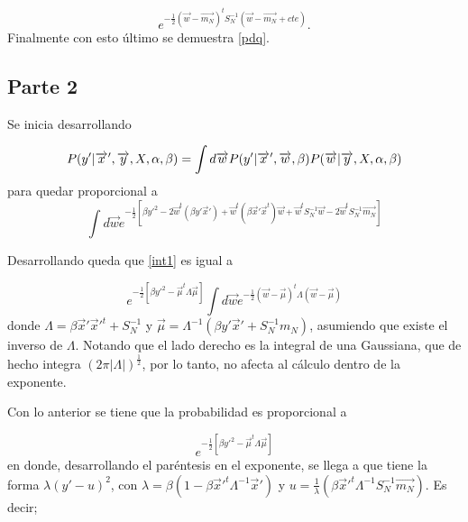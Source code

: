 \begin{equation}
    e^{-\frac{1}{2}(\overrightarrow{w}-\overrightarrow{m_N})^{t}S_{N}^{-1}(\overrightarrow{w}-\overrightarrow{m_N} + cte)}.
\end{equation}
Finalmente con esto último se demuestra \eqref{pdq}.

\subsection{Parte 2}

Se inicia desarrollando

\begin{equation}
    P(y'| \overrightarrow{x}',\overrightarrow{y},X,\alpha,\beta) = \int d\overrightarrow{w} P(y'|\overrightarrow{x}',\overrightarrow{w},\beta)P(\overrightarrow{w}|\overrightarrow{y},X,\alpha,\beta)\\
\end{equation}
para quedar proporcional a
\begin{equation}
\label{int1}
    \int d\overrightarrow{w} e^{-\frac{1}{2}[\beta y'^2-2\overrightarrow{w}^t(\beta y'\overrightarrow{x}')+\overrightarrow{w}^t(\beta\overrightarrow{x}'\overrightarrow{x}^t)\overrightarrow{w}+\overrightarrow{w}^{t}S_{N}^{-1}\overrightarrow{w}-2\overrightarrow{w}^{t}S_{N}^{-1}\overrightarrow{m_N}]}
\end{equation}

Desarrollando queda que \eqref{int1} es igual a

\begin{equation}
    e^{-\frac{1}{2}[\beta y'^2 - \overrightarrow{\mu}^t\Lambda\overrightarrow{\mu}]}\int d\overrightarrow{w}e^{-\frac{1}{2}(\overrightarrow{w}-\overrightarrow{\mu})^t\Lambda(\overrightarrow{w}-\overrightarrow{\mu})}
\end{equation}
donde $\Lambda = \beta\overrightarrow{x}'\overrightarrow{x}'^t + S_{N}^{-1}$ y $\overrightarrow{\mu} = \Lambda^{-1}(\beta y' \overrightarrow{x}' + S_{N}^{-1}m_N)$, asumiendo que existe el inverso de $\Lambda$. Notando que el lado derecho es la integral de una Gaussiana, que de hecho integra $(2\pi|\Lambda|)^{\frac{1}{2}}$, por lo tanto, no afecta al cálculo dentro de la exponente.

Con lo anterior se tiene que la probabilidad es proporcional a

\begin{equation}
    e^{-\frac{1}{2}[\beta y'^2 - \overrightarrow{\mu}^t\Lambda\overrightarrow{\mu}]}
\end{equation}
en donde, desarrollando el paréntesis en el exponente, se llega a que tiene la forma $\lambda (y'-u)^2$, con $\lambda = \beta(1-\beta\overrightarrow{x}'^{t}\Lambda^{-1}\overrightarrow{x}')$ y $u = \frac{1}{\lambda}(\beta\overrightarrow{x}'^{t}\Lambda^{-1}S_{N}^{-1}\overrightarrow{m_N})$. Es decir;

